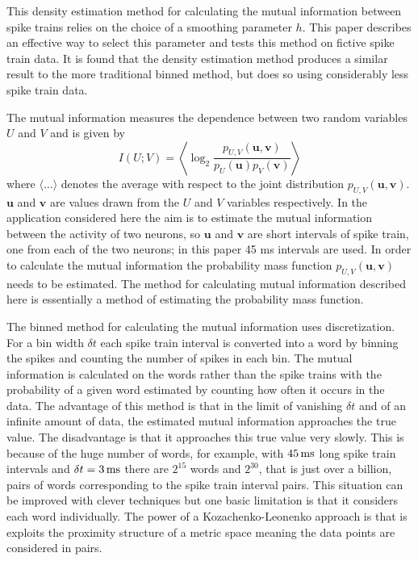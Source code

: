 \documentclass[12pt]{article}
\newcommand{\ms}{\mbox{\,ms}}
\renewcommand{\u}{\mathbf{u}}
\renewcommand{\v}{\mathbf{v}}
\begin{document}
This density estimation method for calculating the mutual information
between spike trains relies on the choice of a smoothing parameter
$h$. This paper describes an effective way to select this parameter
and tests this method on fictive spike train data. It is found that
the density estimation method produces a similar result to the more
traditional binned method, but does so using considerably less spike
train data.

The mutual information measures the dependence between two random
variables $U$ and $V$ and is given by
\begin{equation}
I(U;V)=\left\langle \log_2{\frac{p_{U,V}(\u,\v)}{p_U(\u)p_V(\v)}}\right\rangle
\end{equation}
where $\langle\ldots\rangle$ denotes the average with respect to the
joint distribution $p_{U,V}(\u,\v)$. $\u$ and $\v$ are values drawn
from the $U$ and $V$ variables respectively.  In the application
considered here the aim is to estimate the mutual information between
the activity of two neurons, so $\u$ and $\v$ are short intervals of
spike train, one from each of the two neurons; in this paper 45 ms
intervals are used. In order to calculate the mutual information the
probability mass function $p_{U,V}(\u,\v)$ needs to be estimated. The
method for calculating mutual information described here is
essentially a method of estimating the probability mass function.

The binned method for calculating the mutual information uses
discretization. For a bin width $\delta t$ each spike train interval
is converted into a word by binning the spikes and counting the number
of spikes in each bin. The mutual information is calculated on the
words rather than the spike trains with the probability of a given
word estimated by counting how often it occurs in the data. The
advantage of this method is that in the limit of vanishing $\delta t$
and of an infinite amount of data, the estimated mutual information
approaches the true value. The disadvantage is that it approaches this
true value very slowly. This is because of the huge number of words,
for example, with $45\ms$ long spike train intervals and $\delta
t=3\ms$ there are $2^{15}$ words and $2^{30}$, that is just over a
billion, pairs of words corresponding to the spike train interval
pairs. This situation can be improved with clever techniques
\citep{TrevesPanzeri1995,NemenmanEtAl2004,MagriEtAl2009} but one basic
limitation is that it considers each word individually. The power of a
Kozachenko-Leonenko approach is that is exploits the proximity
structure of a metric space meaning the data points are considered in
pairs.
\end{document}
